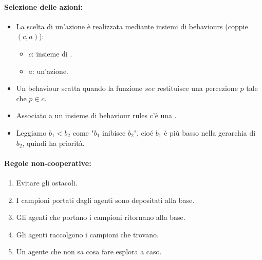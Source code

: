 \paragraph{Selezione delle azioni:}

\begin{itemize}
  \item La scelta di un'azione è realizzata mediante insiemi di behaviours (coppie $(c, a)$):
    \begin{itemize}
      \item $c$: insieme di . 
      \item $a$: un'azione.
    \end{itemize}
  \item Un behaviour scatta quando la funzione $see$ restituisce una percezione $p$ tale che $p \in c$. 
  \item Associato a un insieme di behaviour rules c'è una . 
  \item Leggiamo $b_1 < b_2$ come "$b_1$ inibisce $b_2$", cioé $b_1$ è più basso nella gerarchia di $b_2$, quindi ha priorità.
\end{itemize}


\paragraph{Regole non-cooperative:}

\begin{enumerate}
  \item Evitare gli ostacoli. 
  \item I campioni portati dagli agenti sono depositati alla base. 
  \item Gli agenti che portano i campioni ritornano alla base. 
  \item Gli agenti raccolgono i campioni che trovano. 
  \item Un agente che non sa cosa fare esplora a caso.
\end{enumerate}


